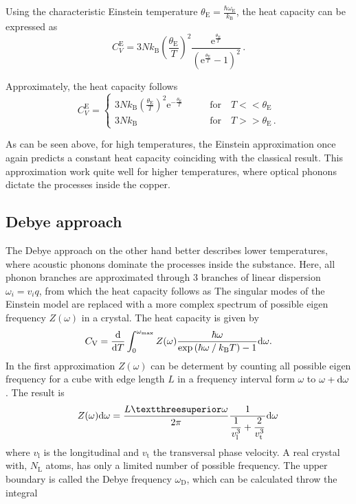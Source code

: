 Using the characteristic Einstein temperature $\theta_\text{E} = \frac{\hbar \omega_\text{E}}{k_\text{B}}$, the heat capacity can be expressed as
\begin{equation}
    C^\text{E}_V = 3 N k_\text{B} \left(\frac{\theta_\text{E}}{T} \right)^2 \frac{\text{e}^{\frac{\theta_\text{E}}{T}}}{\left(\text{e}^{\frac{\theta_\text{E}}{T}} - 1 \right)^2} \,.
    \label{eq:einsteinheatcap}
\end{equation}

Approximately, the heat capacity follows
\begin{equation*}
    C^\text{E}_V = \begin{cases}
        3 N k_\text{B} \left(\frac{\theta_\text{E}}{T} \right)^2 \text{e}^{-\frac{\theta_\text{E}}{T}} &\qquad \text{for} \quad T << \theta_\text{E} \\ 
        3 N k_\text{B} &\qquad \text{for} \quad T >> \theta_\text{E} \,.
    \end{cases} 
\end{equation*}

As can be seen above, for high temperatures, the Einstein approximation once again predicts a constant heat capacity coinciding with the classical result.
This approximation work quite well for higher temperatures, where optical phonons dictate the processes inside the copper. \cite{}

\subsection{Debye approach}

The Debye approach on the other hand better describes lower temperatures, where acoustic phonons dominate the processes inside the substance.
Here, all phonon branches are approximated through $3$ branches of linear dispersion $\omega_i = v_i q$,  from which the heat capacity follows as
The singular modes of the Einstein model are replaced with a more complex spectrum of possible eigen frequency $Z(\omega)$ in a crystal. 
The heat capacity is given by 
\begin{equation}
    C_\text{V} = \dfrac{\mathrm{d}}{\mathrm{d} T} \int^{\omega_\text{max}}_0 Z(\omega) \dfrac{\hbar \omega}{\exp{\left( \hbar \omega \mathbin{/} k_\text{B} T \right)} -1} \mathrm{d}\omega.
    \label{eq:CV_debye}
\end{equation}
In the first approximation $Z(\omega)$ can be determent by counting all possible eigen frequency for a cube with edge length $L$ in a frequency interval form $\omega$ to $\omega + \mathrm{d} \omega$.
The result is 
\begin{equation}
    Z(\omega)\dif\omega = \dfrac{L³ \omega}{2\pi}\dfrac{1}{\dfrac{1}{v^{3}_\text{l}} + \dfrac{2}{v^{3}_\text{t} }}  \dif\omega \, 
    \label{eq:densityofstates}
\end{equation}
where $v_\text{l}$ is the longitudinal and $v_\text{t}$ the transversal phase velocity.
A real crystal with, $ N_\text{L}$ atoms, has only a limited number of possible frequency. The upper boundary is called the Debye frequency $\omega_\text{D}$, which can be calculated throw the integral 

